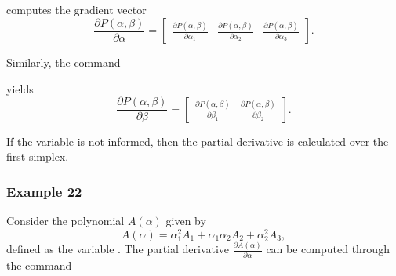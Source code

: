 \documentclass[english,11pt]{article}
\theoremstyle{break} \theorembodyfont{\small\rm}
\begin{document}
\noindent computes the gradient vector
\[
 \frac{\partial P(\alpha,\beta)}{\partial \alpha} = 
 \begin{bmatrix}
    \displaystyle \frac{\partial P(\alpha,\beta)}{\partial \alpha_1} & \displaystyle \frac{\partial P(\alpha,\beta)}{\partial \alpha_2} & \displaystyle \frac{\partial P(\alpha,\beta)}{\partial \alpha_3}
 \end{bmatrix}.
\]

Similarly, the command

\vspace{0.5cm}%
\begin{minipage}{14.5cm}
\end{minipage}
\vspace{0.2cm}

\noindent yields
\[
 \frac{\partial P(\alpha,\beta)}{\partial \beta} = 
 \begin{bmatrix}
    \displaystyle \frac{\partial P(\alpha,\beta)}{\partial \beta_1} & \displaystyle \frac{\partial P(\alpha,\beta)}{\partial \beta_2}
 \end{bmatrix}.
\]

If the variable  is not informed, then the partial derivative is calculated over the first simplex.


\subsubsection*{Example 22}

Consider the polynomial $A(\alpha)$ given by
\[
 A(\alpha) = \alpha_1^2A_1 + \alpha_1\alpha_2A_2 + \alpha_2^2A_3,
\]
defined as the variable .
The partial derivative $\displaystyle\frac{\partial A(\alpha)}{\partial \alpha}$ can be computed through the command
\vspace{0.5cm}%
\begin{minipage}{14.5cm}
\end{minipage}

\vspace{0.5cm}%
\begin{minipage}{7.5cm}
\\
\\
\end{minipage}
\end{document}
